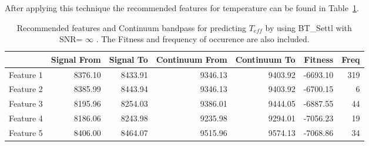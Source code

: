 
After applying this technique the recommended features for temperature 
can be found in Table~\ref{tab:tab_NC_T}. 

\begin{table}
\begin{center}
\begin{tabular}{rrrrrrr}
  \hline
 & Signal From & Signal To & Continuum From & Continuum To & Fitness & Freq \\ 
  \hline
 Feature 1 & 8376.10 & 8433.91 & 9346.13 & 9403.92 & -6693.10 & 319 \\ 
  Feature 2 & 8385.99 & 8443.94 & 9346.13 & 9403.92 & -6700.15 &   6 \\ 
  Feature 3 & 8195.96 & 8254.03 & 9386.01 & 9444.05 & -6887.55 &  44 \\ 
  Feature 4 & 8186.06 & 8243.98 & 9235.98 & 9294.01 & -7056.23 &  19 \\ 
  Feature 5 & 8406.00 & 8464.07 & 9515.96 & 9574.13 & -7068.86 &  34 \\ 
   \hline
\end{tabular}
\caption {Recommended features and Continuum bandpass for predicting $ T_{eff} $ 
      by using BT\_Settl with SNR= $ {\infty} $ . 
      The Fitness and frequency of occurence are also included.} \label{tab:tab_NC_T} 
\end{center}
\end{table}

